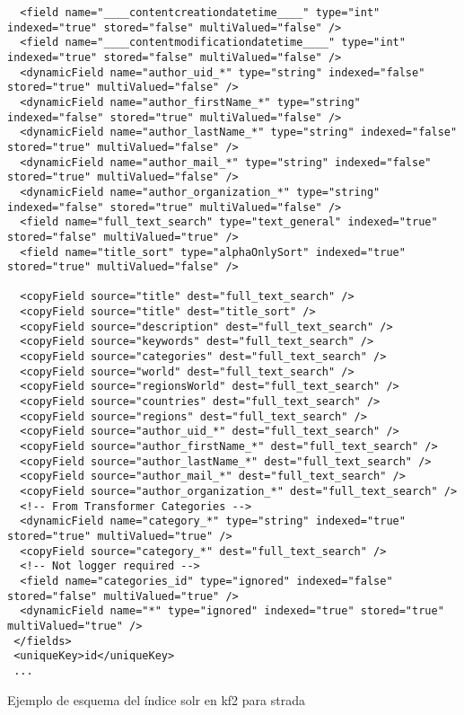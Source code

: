 \begin{listing}[H]
\begin{verbatim}
  <field name="____contentcreationdatetime____" type="int" indexed="true" stored="false" multiValued="false" />
  <field name="____contentmodificationdatetime____" type="int" indexed="true" stored="false" multiValued="false" />
  <dynamicField name="author_uid_*" type="string" indexed="false" stored="true" multiValued="false" />
  <dynamicField name="author_firstName_*" type="string" indexed="false" stored="true" multiValued="false" />
  <dynamicField name="author_lastName_*" type="string" indexed="false" stored="true" multiValued="false" />
  <dynamicField name="author_mail_*" type="string" indexed="false" stored="true" multiValued="false" />
  <dynamicField name="author_organization_*" type="string" indexed="false" stored="true" multiValued="false" />
  <field name="full_text_search" type="text_general" indexed="true" stored="false" multiValued="true" />
  <field name="title_sort" type="alphaOnlySort" indexed="true" stored="true" multiValued="false" />

  <copyField source="title" dest="full_text_search" />  
  <copyField source="title" dest="title_sort" />
  <copyField source="description" dest="full_text_search" />
  <copyField source="keywords" dest="full_text_search" />
  <copyField source="categories" dest="full_text_search" />
  <copyField source="world" dest="full_text_search" />
  <copyField source="regionsWorld" dest="full_text_search" />
  <copyField source="countries" dest="full_text_search" />
  <copyField source="regions" dest="full_text_search" />
  <copyField source="author_uid_*" dest="full_text_search" />
  <copyField source="author_firstName_*" dest="full_text_search" />
  <copyField source="author_lastName_*" dest="full_text_search" />
  <copyField source="author_mail_*" dest="full_text_search" />
  <copyField source="author_organization_*" dest="full_text_search" />
  <!-- From Transformer Categories -->
  <dynamicField name="category_*" type="string" indexed="true" stored="true" multiValued="true" />
  <copyField source="category_*" dest="full_text_search" />
  <!-- Not logger required -->
  <field name="categories_id" type="ignored" indexed="false" stored="false" multiValued="true" />
  <dynamicField name="*" type="ignored" indexed="true" stored="true" multiValued="true" />
 </fields>
 <uniqueKey>id</uniqueKey>
 ...
	\end{verbatim}
	\caption{Ejemplo de esquema del índice \gls{solr} en \gls{kf2} para \gls{strada}}
	\label{code:schema}
\end{listing}

